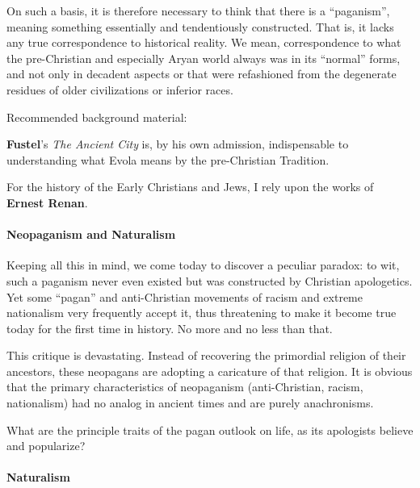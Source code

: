 On such a basis, it is therefore necessary to think that there is a ``paganism'', meaning something essentially and tendentiously constructed. That is, it lacks any true correspondence to historical reality. We mean, correspondence to what the pre-Christian and especially Aryan world always was in its ``normal'' forms, and not only in decadent aspects or that were refashioned from the degenerate residues of older civilizations or inferior races.

\begin{quotex}
Recommended background material:

\textbf{Fustel}'s \emph{The Ancient City} is, by his own admission, indispensable to understanding what Evola means by the pre-Christian Tradition.

For the history of the Early Christians and Jews, I rely upon the works of \textbf{Ernest Renan}.
\end{quotex}

\paragraph{Neopaganism and Naturalism}

Keeping all this in mind, we come today to discover a peculiar paradox: to wit, such a paganism never even existed but was constructed by Christian apologetics. Yet some ``pagan'' and anti-Christian movements of racism and extreme nationalism very frequently accept it, thus threatening to make it become true today for the first time in history. No more and no less than that.

\begin{quotex}
This critique is devastating. Instead of recovering the primordial religion of their ancestors, these neopagans are adopting a caricature of that religion. It is obvious that the primary characteristics of neopaganism (anti-Christian, racism, nationalism) had no analog in ancient times and are purely anachronisms.
\end{quotex}

What are the principle traits of the pagan outlook on life, as its apologists believe and popularize?

\paragraph{Naturalism}

